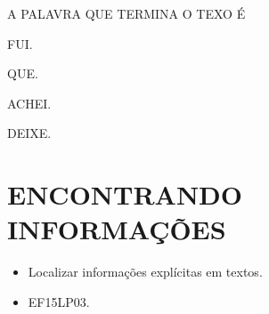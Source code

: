 A PALAVRA QUE TERMINA O TEXO É

\begin{escolha}
\item FUI.

\item QUE.

\item ACHEI.

\item DEIXE.
\end{escolha}

\chapter{ENCONTRANDO INFORMAÇÕES}


\begin{itemize}
\item Localizar informações explícitas em textos.
\end{itemize}


\begin{itemize}
\item EF15LP03.
\end{itemize}


